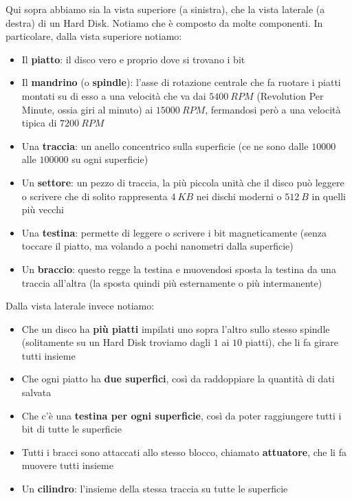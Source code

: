 \documentclass[11pt, a4paper, titlepage, oneside]{scrbook}
\begin{document}
Qui sopra abbiamo sia la vista superiore (a sinistra), che la vista laterale (a destra) di un Hard Disk. Notiamo che è composto da molte componenti. In particolare, dalla vista superiore notiamo:
\begin{itemize}
    \item Il \textbf{piatto}: il disco vero e proprio dove si trovano i bit
    \item Il \textbf{mandrino} (o \textbf{spindle}): l'asse di rotazione centrale che fa ruotare i piatti montati su di esso a una velocità che va dai $\SI{5400}{RPM}$ (Revolution Per Minute, ossia giri al minuto) ai $\SI{15000}{RPM}$, fermandosi però a una velocità tipica di $\SI{7200}{RPM}$
    \item Una \textbf{traccia}: un anello concentrico sulla superficie (ce ne sono dalle $10000$ alle $100000$ su ogni superficie)
    \item Un \textbf{settore}: un pezzo di traccia, la più piccola unità che il disco può leggere o scrivere che di solito rappresenta $\SI{4}{KB}$ nei dischi moderni o $\SI{512}{B}$ in quelli più vecchi
    \item Una \textbf{testina}: permette di leggere o scrivere i bit magneticamente (senza toccare il piatto, ma volando a pochi nanometri dalla superficie)
    \item Un \textbf{braccio}: questo regge la testina e muovendosi sposta la testina da una traccia all'altra (la sposta quindi più esternamente o più intermanente)  
\end{itemize}

Dalla vista laterale invece notiamo:
\begin{itemize}
    \item Che un disco ha \textbf{più piatti} impilati uno sopra l'altro sullo stesso spindle (solitamente su un Hard Disk troviamo dagli $1$ ai $10$ piatti), che li fa girare tutti insieme
    \item Che ogni piatto ha \textbf{due superfici}, così da raddoppiare la quantità di dati salvata
    \item Che c'è una \textbf{testina per ogni superficie}, così da poter raggiungere tutti i bit di tutte le superficie
    \item Tutti i bracci sono attaccati allo stesso blocco, chiamato \textbf{attuatore}, che li fa muovere tutti insieme
    \item Un \textbf{cilindro}: l'insieme della stessa traccia su tutte le superficie
\end{itemize}
\end{document}
